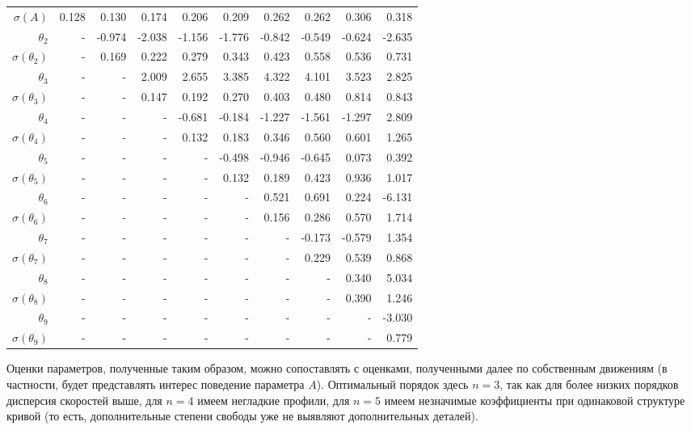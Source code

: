 \documentclass{matmex-diploma-custom}
\begin{document}
\begin{table}[h!!]
\begin{tabular}{r|rr|r|rrrrrr}
 $\sigma(A) $ & 0.128     &    0.130 &   0.174 &   0.206 &   0.209 &   0.262 &   0.262 &   0.306 &   0.318  \\
 $\theta_2$&-        &  -0.974 &  -2.038 &  -1.156 &  -1.776 &  -0.842 &  -0.549 &  -0.624 &  -2.635  \\
 $\sigma(\theta_2)$&-      &   0.169 &   0.222 &   0.279 &   0.343 &   0.423 &   0.558 &   0.536 &   0.731  \\
 $\theta_3$&-      &    - &   2.009 &   2.655 &   3.385 &   4.322 &   4.101 &   3.523 &   2.825  \\
 $\sigma(\theta_3)$&-      &    - &   0.147 &   0.192 &   0.270 &   0.403 &   0.480 &   0.814 &   0.843  \\
 $\theta_4$&-      &    - &    - &  -0.681 &  -0.184 &  -1.227 &  -1.561 &  -1.297 &   2.809  \\
 $\sigma(\theta_4)$&-      &    - &    - &   0.132 &   0.183 &   0.346 &   0.560 &   0.601 &   1.265  \\
 $\theta_5$&-      &    - &    - &    - &  -0.498 &  -0.946 &  -0.645 &   0.073 &   0.392  \\
 $\sigma(\theta_5)$&-      &    - &    - &    - &   0.132 &   0.189 &   0.423 &   0.936 &   1.017  \\
 $\theta_6$&-      &    - &    - &    - &    - &   0.521 &   0.691 &   0.224 &  -6.131  \\
 $\sigma(\theta_6)$&-    &    - &    - &    - &    - &   0.156 &   0.286 &   0.570 &   1.714  \\
 $\theta_7$&-     &    - &    - &    - &    - &    - &  -0.173 &  -0.579 &   1.354  \\
 $ \sigma(\theta_7)$&-     &    - &    - &    - &    - &    - &   0.229 &   0.539 &   0.868  \\
 $\theta_8$&-     &    - &    - &    - &    - &    - &    - &   0.340 &   5.034  \\
 $ \sigma(\theta_8)$&-     &    - &    - &    - &    - &    - &    - &   0.390 &   1.246  \\
 $\theta_9$&-     &    - &    - &    - &    - &    - &    - &    - &  -3.030  \\
 $ \sigma(\theta_9)$&-     &    - &    - &    - &    - &    - &    - &    - &   0.779  \\

\end{tabular}
\end{table}

Оценки параметров, полученные таким образом, можно сопоставлять с оценками, полученными далее по собственным движениям (в частности, будет представлять интерес поведение параметра $A$). Оптимальный порядок здесь $n = 3$, так как для более низких порядков дисперсия скоростей выше, для $n = 4$ имеем негладкие профили, для $n = 5$ имеем незначимые коэффициенты при одинаковой структуре кривой (то есть, дополнительные степени свободы уже не выявляют дополнительных деталей).
\pagebreak
\end{document}
